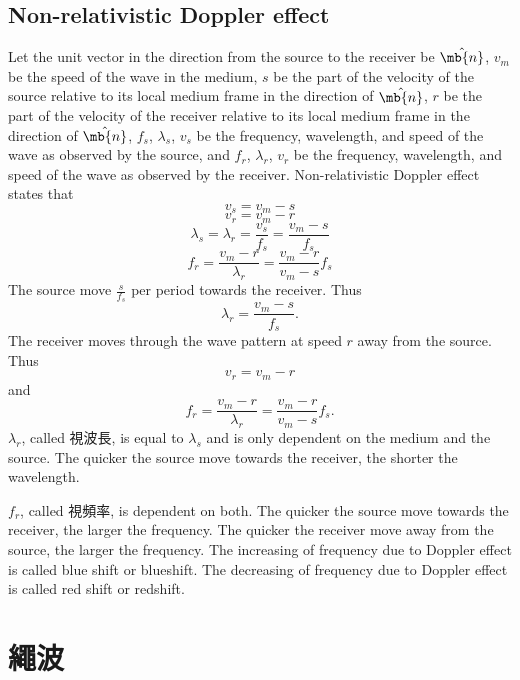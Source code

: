\documentclass[a4paper,12pt]{report}
\begin{document}
\subsection{Non-relativistic Doppler effect}
Let the unit vector in the direction from the source to the receiver be $\hat{\mb{n}}$, $v_m$ be the speed of the wave in the medium, $s$ be the part of the velocity of the source relative to its local medium frame in the direction of $\hat{\mb{n}}$, $r$ be the part of the velocity of the receiver relative to its local medium frame in the direction of $\hat{\mb{n}}$, $f_s$, $\lambda_s$, $v_s$ be the frequency, wavelength, and speed of the wave as observed by the source, and $f_r$, $\lambda_r$, $v_r$ be the frequency, wavelength, and speed of the wave as observed by the receiver. Non-relativistic Doppler effect states that
\[v_s=v_m-s\]
\[v_r=v_m-r\]
\[\lambda_s=\lambda_r=\frac{v_s}{f_s}=\frac{v_m-s}{f_s}\]
\[f_r=\frac{v_m-r}{\lambda_r}=\frac{v_m-r}{v_m-s}f_s\]
\bpr
The source move $\frac{s}{f_s}$ per period towards the receiver. Thus
\[\lambda_r=\frac{v_m-s}{f_s}.\]
The receiver moves through the wave pattern at speed $r$ away from the source. Thus
\[v_r=v_m-r\]
and
\[f_r=\frac{v_m-r}{\lambda_r}=\frac{v_m-r}{v_m-s}f_s.\]
\epr
{}
$\lambda_r$, called 視波長, is equal to $\lambda_s$ and is only dependent on the medium and the source. The quicker the source move towards the receiver, the shorter the wavelength.

$f_r$, called 視頻率, is dependent on both. The quicker the source move towards the receiver, the larger the frequency. The quicker the receiver move away from the source, the larger the frequency.
The increasing of frequency due to Doppler effect is called blue shift or blueshift. The decreasing of frequency due to Doppler effect is called red shift or redshift.


\section{繩波}
\end{document}
